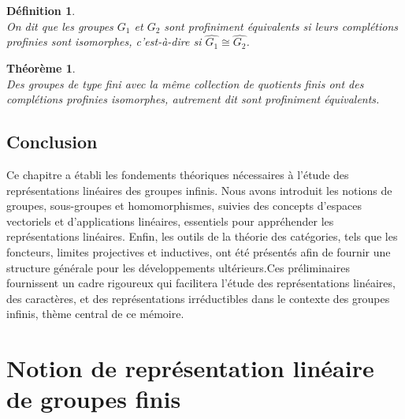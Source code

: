 \documentclass[a4paper, 14pt]{report}
\newtheorem{definition}{Définition}[section]
\newtheorem{theorem}{Théorème}[section]
\newcommand{\applyfontsize}{%
	\fontsize{12}{12}\selectfont
}
\begin{document}
\begin{onehalfspace}
{			
			\begin{definition} \cite{ribes-zalesskii}\\
				On dit que les groupes $G_1$ et $G_2$ sont \textit{profiniment équivalents} si leurs complétions profinies sont isomorphes, c'est-à-dire si $\widehat{G_1} \cong \widehat{G_2}$.
			\end{definition}
			
			\begin{theorem} \cite{herfort2012profinite}\\
				Des groupes de type fini avec la même collection de quotients finis ont des complétions profinies isomorphes, autrement dit sont profiniment équivalents.
			\end{theorem}
			
			\section*{Conclusion}
			Ce chapitre a établi les fondements théoriques nécessaires à l’étude des représentations linéaires des groupes infinis. Nous avons introduit les notions de groupes, sous-groupes et homomorphismes, suivies des concepts d’espaces vectoriels et d’applications linéaires, essentiels pour appréhender les représentations linéaires. Enfin, les outils de la théorie des catégories, tels que les foncteurs, limites projectives et inductives, ont été présentés afin de fournir une structure générale pour les développements ultérieurs.Ces préliminaires fournissent un cadre rigoureux qui facilitera l’étude des représentations linéaires, des caractères, et des représentations irréductibles dans le contexte des groupes infinis, thème central de ce mémoire.
			
		}
		
		
		
		\chapter{Notion de représentation linéaire de groupes finis}
		
		{
			\applyfontsize %
			
}
\end{onehalfspace}
\end{document}
